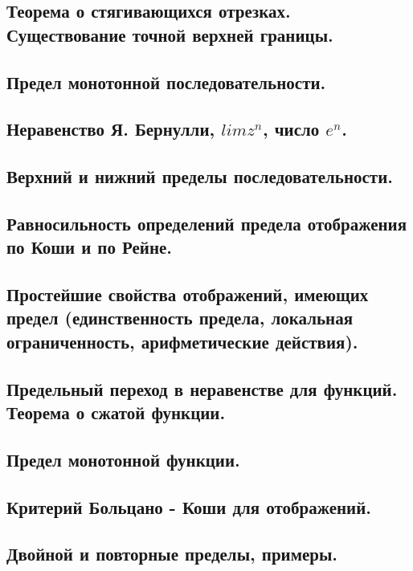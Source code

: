 \documentclass[12pt, a4paper]{article}
\begin{document}
\subsection{Теорема о стягивающихся отрезках. Существование точной верхней границы.}

\subsection{Предел монотонной последовательности.}

\subsection{Неравенство Я. Бернулли, $lim z^n$, число $e^n$.}

\subsection{Верхний и нижний пределы последовательности.}

\subsection{Равносильность определений предела отображения по Коши и по Рейне.}

\subsection{Простейшие свойства отображений, имеющих предел (единственность предела, локальная ограниченность, арифметические действия).}

\subsection{Предельный переход в неравенстве для функций. Теорема о сжатой функции.}

\subsection{Предел монотонной функции.}

\subsection{Критерий Больцано - Коши для отображений.}

\subsection{Двойной и повторные пределы, примеры.}
\end{document}

